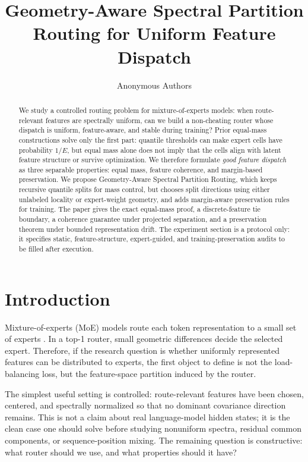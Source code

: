 \documentclass{article}
\title{Geometry-Aware Spectral Partition Routing for Uniform Feature Dispatch}
\author{Anonymous Authors}
\begin{document}
\maketitle

\begin{abstract}
We study a controlled routing problem for mixture-of-experts models: when
route-relevant features are spectrally uniform, can we build a non-cheating
router whose dispatch is uniform, feature-aware, and stable during training?
Prior equal-mass constructions solve only the first part: quantile thresholds can
make expert cells have probability $1/E$, but equal mass alone does not imply
that the cells align with latent feature structure or survive optimization.  We
therefore formulate \emph{good feature dispatch} as three separable properties:
equal mass, feature coherence, and margin-based preservation.  We propose
Geometry-Aware Spectral Partition Routing, which keeps recursive quantile splits
for mass control, but chooses split directions using either unlabeled locality or
expert-weight geometry, and adds margin-aware preservation rules for training.
The paper gives the exact equal-mass proof, a discrete-feature tie boundary, a
coherence guarantee under projected separation, and a preservation theorem under
bounded representation drift.  The experiment section is a protocol only: it
specifies static, feature-structure, expert-guided, and training-preservation
audits to be filled after execution.
\end{abstract}

\section{Introduction}

Mixture-of-experts (MoE) models route each token representation to a small set of
experts \citep{shazeer2017outrageously,fedus2022switch}.  In a top-1 router,
small geometric differences decide the selected expert.  Therefore, if the
research question is whether uniformly represented features can be distributed to
experts, the first object to define is not the load-balancing loss, but the
feature-space partition induced by the router.

The simplest useful setting is controlled: route-relevant features have been
chosen, centered, and spectrally normalized so that no dominant covariance
direction remains.  This is not a claim about real language-model hidden states;
it is the clean case one should solve before studying nonuniform spectra,
residual common components, or sequence-position mixing.  The remaining question
is constructive: what router should we use, and what properties should it have?
\end{document}
